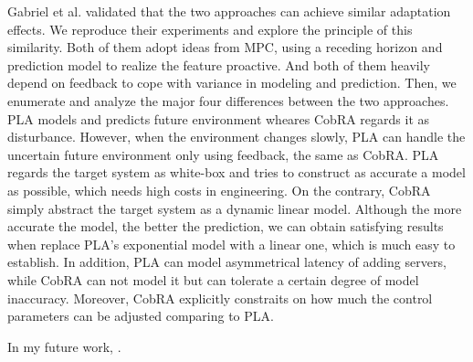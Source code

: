 \documentclass[sigconf]{acmart}
\begin{document}
	Gabriel et al. validated that the two approaches can achieve similar adaptation effects. We reproduce their experiments and explore the principle of this similarity. Both of them adopt ideas from MPC, using a receding horizon and prediction model to realize the feature proactive. And both of them heavily depend on feedback to cope with variance in modeling and prediction. Then, we enumerate and analyze the major four differences between the two approaches. PLA models and predicts future environment wheares CobRA regards it as disturbance. However, when the environment changes slowly, PLA can handle the uncertain future environment only using feedback, the same as CobRA. PLA regards the target system as white-box and tries to construct as accurate a model as possible, which needs high costs in engineering. On the contrary, CobRA simply abstract the target system as a dynamic linear model. Although the more accurate the model, the better the prediction, we can obtain satisfying results when replace PLA's exponential model with a linear one, which is much easy to establish. In addition, PLA can model asymmetrical latency of adding servers, while CobRA can not model it but can tolerate a certain degree of model inaccuracy. Moreover, CobRA explicitly constraits on how much the control parameters can be adjusted comparing to PLA.
	
	
	In my future work, .
	
	
\end{document}
